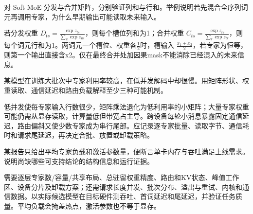 \begin{exercises}
\begin{exercise}\optional 对 Soft MoE 分发与合并矩阵，分别验证列和与行和。举例说明若先混合全序列词元再调用专家，为什么早期输出可能读取未来输入。

\begin{solution}
若分发权重 $D_{ts}=\frac{\exp z_{ts}}{\sum_u\exp z_{us}}$，则每个槽位列和为1；合并权重 $C_{ts}=\frac{\exp z_{ts}}{\sum_r\exp z_{tr}}$，则每个词元行和为1。两词元一个槽位、权重各$\frac{1}{2}$时，槽输入 $\frac{x_1+x_2}{2}$，若专家为恒等，则第一个输出直接含x2。仅在最终合并处加因果mask不能消除已经混入的未来信息。
\end{solution}
\end{exercise}

\begin{exercise} 某模型在训练大批次中专家利用率较高，在低并发解码中却很慢。用矩阵形状、权重读取、通信延迟和路由负载解释至少三种可能机制。

\begin{solution}
低并发使每专家输入行数很少，矩阵乘法退化为低利用率的小矩阵；大量专家权重可能仍需从显存读取，计算量低但带宽占主导。跨设备每轮小消息暴露固定通信延迟，路由偏斜又使少数专家成为串行尾部。应记录逐专家批量、读取字节、通信耗时和请求尾延迟，再决定合批、放置或卸载策略。
\end{solution}
\end{exercise}

\begin{exercise} 某报告只给出平均专家负载和激活参数量，便断言单卡内存与吞吐满足上线需求。说明尚缺哪些可支持结论的结构信息和运行证据。

\begin{solution}
需要逐层专家数/容量/共享布局、总驻留权重精度、路由和KV状态、峰值工作区、设备分片及卸载方案；还需请求长度并发、批次分布、溢出与重试、内核和通信数据。以实际候选模型在目标硬件测吞吐、首词延迟和尾延迟，并验证任务质量。平均负载会掩盖热点，激活参数也不等于显存。
\end{solution}
\end{exercise}

\end{exercises}
